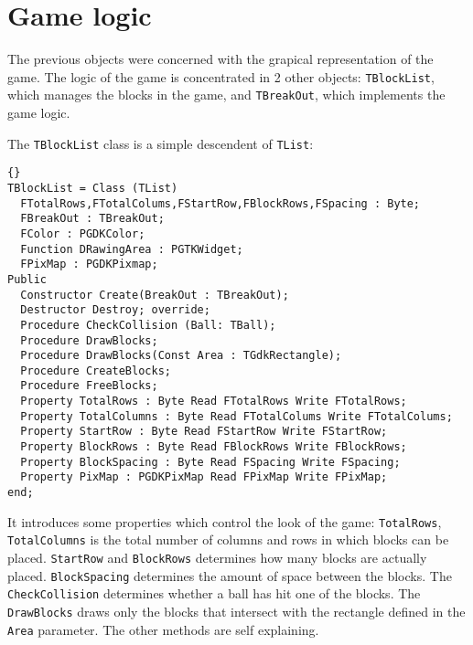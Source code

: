 \documentclass[10pt]{article}
\newcommand{\var}[1]{\texttt{#1}}
\begin{document}
\section{Game logic}
The previous objects were concerned with the grapical representation of the
game. The logic of the game is concentrated in 2 other objects: \var{TBlockList},
 which manages the blocks in the game, and \var{TBreakOut}, which implements the
game logic.

The \var{TBlockList} class is a simple descendent of \var{TList}:
\begin{lstlisting}{}
TBlockList = Class (TList)
  FTotalRows,FTotalColums,FStartRow,FBlockRows,FSpacing : Byte;
  FBreakOut : TBreakOut;
  FColor : PGDKColor;
  Function DRawingArea : PGTKWidget;
  FPixMap : PGDKPixmap;
Public 
  Constructor Create(BreakOut : TBreakOut);
  Destructor Destroy; override;
  Procedure CheckCollision (Ball: TBall);
  Procedure DrawBlocks;
  Procedure DrawBlocks(Const Area : TGdkRectangle);
  Procedure CreateBlocks;
  Procedure FreeBlocks;
  Property TotalRows : Byte Read FTotalRows Write FTotalRows;
  Property TotalColumns : Byte Read FTotalColums Write FTotalColums;
  Property StartRow : Byte Read FStartRow Write FStartRow;
  Property BlockRows : Byte Read FBlockRows Write FBlockRows;
  Property BlockSpacing : Byte Read FSpacing Write FSpacing; 
  Property PixMap : PGDKPixMap Read FPixMap Write FPixMap;
end;
\end{lstlisting}
It introduces some properties which control the look of the game:
\var{TotalRows}, \var{TotalColumns} is the total number of columns 
and rows in which blocks can be placed. \var{StartRow} and \var{BlockRows}
determines how many blocks are actually placed. \var{BlockSpacing} determines
the amount of space between the blocks. The \var{CheckCollision} determines
whether a ball has hit one of the blocks. The \var{DrawBlocks} draws only the blocks
that intersect with the rectangle defined in the \var{Area} parameter.
The other methods are self explaining.
\end{document}
